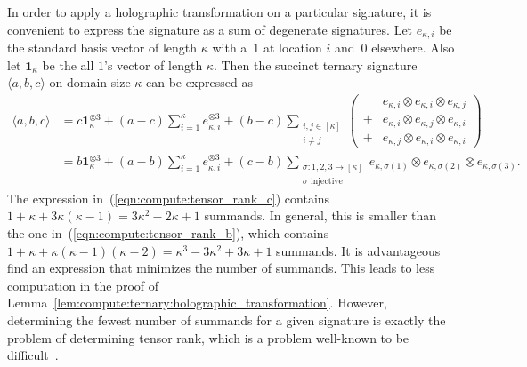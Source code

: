 \documentclass[11pt]{article}
\begin{document}
In order to apply a holographic transformation on a particular signature,
it is convenient to express the signature as a sum of degenerate signatures.
Let $e_{\kappa,i}$ be the standard basis vector of length $\kappa$ with a~$1$ at location $i$ and~$0$ elsewhere.
Also let $\mathbf{1}_\kappa$ be the all $1$'s vector of length $\kappa$.
Then the succinct ternary signature $\langle a,b,c \rangle$ on domain size $\kappa$ can be expressed as
\begin{align}
 \langle a,b,c \rangle
 &=
 c \mathbf{1}_\kappa^{\otimes 3}
 + (a - c) \sum_{i=1}^\kappa e_{\kappa,i}^{\otimes 3}
 + (b - c) \sum_{\substack{i,j \in [\kappa]\\i \ne j}}
 \left(
 \begin{array}{rl}
    & e_{\kappa, i} \otimes e_{\kappa, i} \otimes e_{\kappa, j}\\
  + & e_{\kappa, i} \otimes e_{\kappa, j} \otimes e_{\kappa, i}\\
  + & e_{\kappa, j} \otimes e_{\kappa, i} \otimes e_{\kappa, i}
 \end{array}
 \right) \label{eqn:compute:tensor_rank_c}\\
 &=
 b \mathbf{1}_\kappa^{\otimes 3}
 + (a - b) \sum_{i=1}^\kappa e_{\kappa,i}^{\otimes 3}
 + (c - b) \sum_{\substack{\sigma : {1,2,3} \to [\kappa]\\\sigma \text{ injective}}} e_{\kappa, \sigma(1)} \otimes e_{\kappa, \sigma(2)} \otimes e_{\kappa, \sigma(3)}. \label{eqn:compute:tensor_rank_b}
\end{align}
The expression in~(\ref{eqn:compute:tensor_rank_c}) contains $1 + \kappa + 3 \kappa (\kappa - 1) = 3 \kappa^2 - 2 \kappa + 1$ summands.
In general, this is smaller than the one in~(\ref{eqn:compute:tensor_rank_b}),
which contains $1 + \kappa + \kappa (\kappa - 1) (\kappa - 2) = \kappa^3 - 3 \kappa^2 + 3 \kappa + 1$ summands.
It is advantageous find an expression that minimizes the number of summands.
This leads to less computation in the proof of Lemma~\ref{lem:compute:ternary:holographic_transformation}.
However, determining the fewest number of summands for a given signature is exactly the problem of determining tensor rank,
which is a problem well-known to be difficult~\cite{Has90}.
\end{document}
